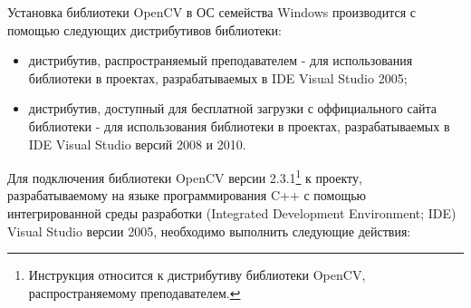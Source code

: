 
Установка библиотеки OpenCV в ОС семейства Windows производится с помощью следующих дистрибутивов библиотеки:

\begin{itemize}

	\item дистрибутив, распространяемый преподавателем - для использования библиотеки в проектах, разрабатываемых в IDE Visual Studio 2005;
	\item дистрибутив, доступный для бесплатной загрузки с оффициального сайта библиотеки \cite{opencv} - для использования библиотеки в проектах, разрабатываемых в IDE Visual Studio версий 2008 и 2010.

\end{itemize}

Для подключения библиотеки OpenCV версии 2.3.1\footnote{Инструкция относится к дистрибутиву библиотеки OpenCV, распространяемому преподавателем.} к проекту, разрабатываемому на языке программирования C++ с помощью интегрированной среды разработки (Integrated Developm\-ent Environment; IDE) Visual Studio версии 2005, необходимо выполнить следующие действия:

